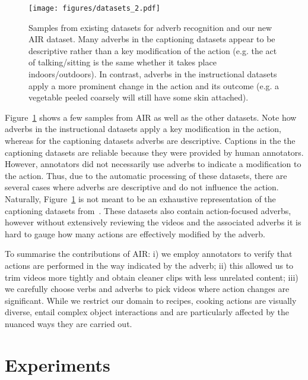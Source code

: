 \documentclass[10pt,twocolumn,letterpaper]{article}
\begin{document}
\begin{figure}[t]
    \centering
    \texttt{[image: figures/datasets\_2.pdf]}
    \caption{Samples from existing datasets for adverb recognition and our new AIR dataset. Many adverbs in the \textcolor{captioning_col}{captioning datasets} appear to be  
    descriptive rather than a key modification of the action (e.g. the act of talking/sitting is the same whether it takes place indoors/outdoors). In contrast, adverbs in the \textcolor{instr_col}{instructional datasets} apply a more prominent change in the action and its outcome (e.g. a vegetable peeled coarsely will still have some skin attached).}
    \label{fig:datasets}
    \vspace{-5pt}
\end{figure}

Figure~\ref{fig:datasets} shows a few samples from AIR as well as the other datasets. Note how adverbs in the instructional datasets apply a key modification in the action, whereas for the captioning datasets adverbs are 
descriptive. 
Captions in the 
the captioning datasets 
are reliable because they were provided by human annotators. However, annotators did not necessarily use adverbs to indicate a modification to the action. Thus, due to the automatic processing of these datasets, there are several cases where adverbs are descriptive and do not influence the action.
Naturally, Figure~\ref{fig:datasets} is not meant to be an exhaustive representation of the captioning datasets from~\cite{doughty2022you}. 
These datasets also contain action-focused adverbs, 
however without extensively reviewing the videos and the associated adverbs it is hard to gauge how many actions are effectively modified by the adverb.

To summarise the contributions of AIR: i) we employ annotators to verify that actions are performed in the way indicated by the adverb; ii) this allowed us to trim videos more tightly and obtain cleaner clips with less unrelated content; iii) we carefully choose verbs and adverbs to pick videos where action changes are significant. 
While we restrict our domain to recipes, cooking actions are visually diverse, 
entail complex object interactions and are particularly affected by the nuanced ways they are carried out. 

\section{Experiments}
\label{sec:experiments}
\end{document}
